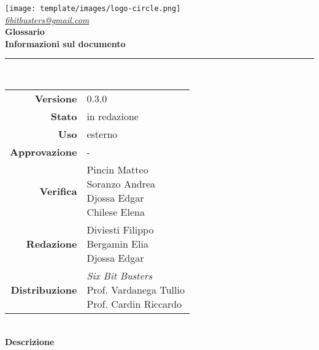 \thispagestyle{empty}
\renewcommand{\arraystretch}{1.3}


\begin{titlepage}
	\begin{center}
		
	\texttt{[image: template/images/logo-circle.png]}
	\\[1cm]
	\href{mailto:6bitbusters@gmail.com}		      	
	{\large{\textit{6bitbusters@gmail.com} } }\\[1cm]
	
	\Huge \textbf{Glossario} \\[1cm]

	\large \textbf{Informazioni sul documento} \\
	\rule{0.6\textwidth}{0.4pt}
	\\[0.5cm]
	\begin{tabular}{r|l}
		\textbf{Versione} & 0.3.0\\
		\textbf{Stato} & in redazione\\
		\textbf{Uso} & esterno\\                         
		\textbf{Approvazione} & -\\                      
		\textbf{Verifica} & \parbox[t]{5cm}{Pincin Matteo \\ Soranzo Andrea \\ Djossa Edgar \\Chilese Elena}\\                         
		\textbf{Redazione} & \parbox[t]{5cm}{Diviesti Filippo\\ Bergamin Elia \\ Djossa Edgar}\\
		\textbf{Distribuzione} & \parbox[t]{5cm}{ \textit{Six Bit Busters} \\ Prof. Vardanega Tullio 
	 \\ Prof. Cardin Riccardo}
	\end{tabular}	
	\\[1.2cm]

	\large \textbf{Descrizione} \\
	
	
	\end{center}
\end{titlepage}
